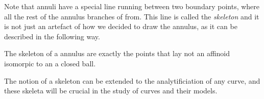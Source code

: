 Note that annuli have a special line running between two boundary points, where all the rest of the annulus branches of from. This line is called the \emph{skeleton} and it is not just an artefact of how we decided to draw the annulus, as it can be described in the following way. 
\begin{proposition}
	The skeleton of a annulus are exactly the points that lay not an affinoid isomorpic to an a closed ball.  
\end{proposition}

The notion of a skeleton can be extended to the analytificiation of any curve, and these skeleta will be crucial in the study of curves and their models. 

